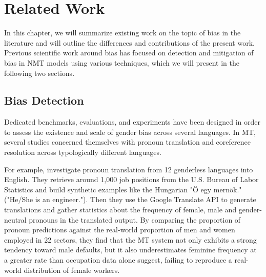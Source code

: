 \chapter{Related Work}
\label{ch:Related_work}



In this chapter, we will summarize existing work on the topic of bias in the literature and will outline the differences and contributions of the present work. Previous scientific work around bias has focused on detection and mitigation of bias in NMT models using various techniques, which we will present in the following two sections.  %

\section{Bias Detection}
\label{sec:Background:Bias_Detection}

Dedicated benchmarks, evaluations, and experiments have been designed in order to assess the existence and scale of gender bias across several languages. In MT, several studies concerned themselves with pronoun translation and coreference resolution across typologically different languages. 

For example, \citet{Prates_2019} investigate pronoun translation from 12 genderless languages into English. They retrieve around 1,000 job positions from the U.S. Bureau of Labor Statistics and build synthetic examples like the Hungarian "Ö egy mernök." ("He/She is an engineer."). Then they use the Google Translate API to generate translations and gather statistics about the frequency of female, male and gender-neutral pronouns in the translated output. By comparing the proportion of pronoun predictions against the real-world proportion of men and women employed in 22 sectors, they find that the MT system not only exhibits a strong tendency toward male defaults, but it also underestimates feminine frequency at a greater rate than occupation data alone suggest, failing to reproduce a real-world distribution of female workers.

